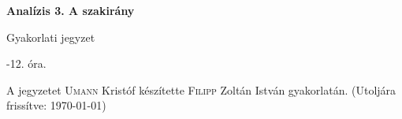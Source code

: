 \documentclass[a4paper,11.5pt]{article}
\begin{document}
	\setlength\parindent{0pt}
	\def\a{\textbf{a}}
	\def\b{\textbf{b}}
	\def\N{\hskip 10 true mm}
	\def\a{\textbf{a}}
	\def\b{\textbf{b}}
	\def\c{\textbf{c}}
	\def\d{\textbf{d}}
	\def\e{\textbf{e}}
	\def\gg{$\gamma$}
	\def\vi{\textbf{i}}
	\def\jj{\textbf{j}}
	\def\kk{\textbf{k}}
	\def\fh{\overrightarrow}
	\def\l{\lambda}
	\def\m{\mu}
	\def\v{\textbf{v}}
	\def\0{\textbf{0}}
	\def\s{\hspace{0.2mm}\vphantom{\beta}}
	\def\Z{\mathbb{Z}}
	\def\Q{\mathbb{Q}}
	\def\R{\mathbb{R}}
	\def\C{\mathbb{C}}
	\def\N{\mathbb{N}}
	\def\Rn{\mathbb{R}^{n}}
	\def\Ra{\overline{\mathbb{R}}}
	\def\sume{\displaystyle\sum_{n=1}^{+\infty}}
	\def\sumn{\displaystyle\sum_{n=0}^{+\infty}}
	\def\biz{\emph{Bizonyítás:\ }}
	\def\narrow{\underset{n\rightarrow+\infty}{\longrightarrow}}
	\def\limn{\displaystyle\lim_{n\to +\infty}}
	
	\theoremstyle{definition}
	\newtheorem{theorem}{Tétel}[subsubsection] %
	
	\theoremstyle{definition}
	\newtheorem{definition}[theorem]{Definíció} %
	\newtheorem{example}[theorem]{Példa} %
	\newtheorem{exercise}[theorem]{Házi feladat} %
	\newtheorem{note}[theorem]{Megjegyzés} %
	\newtheorem{task}[theorem]{Feladat} %
	\newtheorem{revision}[theorem]{Emlékeztető} %
	\begin{center}
		{\LARGE\textbf{Analízis 3. A szakirány}}
		\smallskip

		{\Large Gyakorlati jegyzet}

		-12. óra.
	\end{center}
	A jegyzetet \textsc{Umann} Kristóf készítette \textsc{Filipp} Zoltán István gyakorlatán. (Utoljára frissítve: \today)	\tableofcontents
\end{document}
